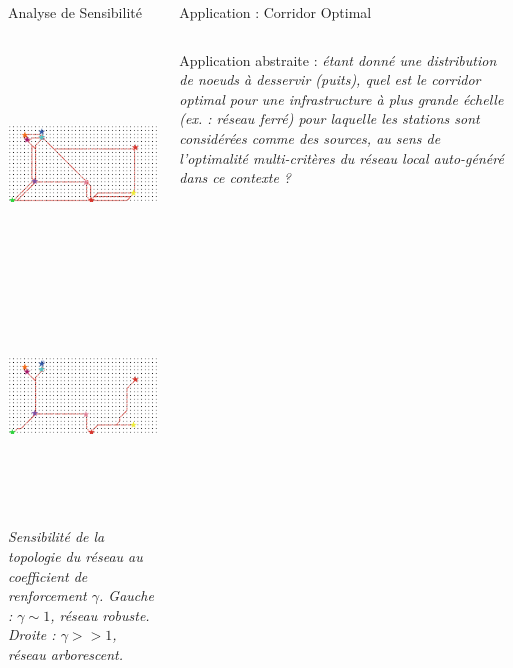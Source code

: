 \documentclass{beamer}
\begin{document}
\begin{frame}{}
\begin{columns}[t]
\begin{column}{.49\textwidth}
\begin{block}{Analyse de Sensibilité}
\begin{columns}[t]
\begin{column}{.47\textwidth}
           
            \includegraphics[width=0.5\columnwidth,height=6cm]{figures/networkDense}
          \includegraphics[width=0.5\columnwidth,height=6cm]{figures/networkLessDense}\\
          \bigskip
          \begin{justify}
          \textit{Sensibilité de la topologie du réseau au coefficient de renforcement $\gamma$. Gauche : $\gamma \sim 1$, réseau robuste. Droite : $\gamma >> 1$, réseau arborescent.}
          \end{justify}
          \end{column}
          \end{columns}
        \end{block}
        
        
      \end{column}
      
      
      \begin{column}{.49\textwidth}
      
        \begin{block}{Application : Corridor Optimal}
          \begin{columns}[t]
        \begin{column}{.95\textwidth}
        \begin{justify}
        \vspace{-2cm}
          Application abstraite : \textit{étant donné une distribution de noeuds à desservir (puits), quel est le corridor optimal pour une infrastructure à plus grande échelle (ex. : réseau ferré) pour laquelle les stations sont considérées comme des sources, au sens de l'optimalité multi-critères du réseau local auto-généré dans ce contexte ?}
          

\end{justify}
\end{column}
\end{columns}
\end{block}
\end{column}
\end{columns}
\end{frame}
\end{document}
